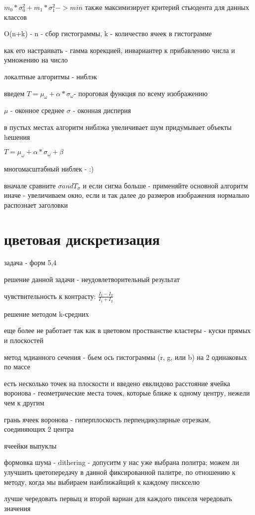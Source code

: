 \documentclass[]{report}
\begin{document}
$m_0*\sigma_0^2 + m_1*\sigma_1^2 -> min$
также максимизирует критерий стьюдента для данных классов

O(n+k) - n - сбор гистограммы, k - количество ячеек в гистограмме

как его настраивать - гамма корекцией, инвариантер к прибавлению числа и умножению на число

локалтные алгоритмы - ниблэк

введем $T=\mu_\omega+\alpha*\sigma_\omega$- пороговая функция по всему изображению

$\mu$ - оконное среднее
$\sigma$ - оконная дисперия

в пустых местах алгоритм ниблэка увеличивает шум
придумывает объекты
hешения

$T=\mu_\omega+\alpha*\sigma_\omega+\beta$

многомасштабный ниблек - :)

вначале сравните $\sigma and T_\sigma$
и если сигма больше - применяйте основной алгоритм
иначе - увеличиваем окно, если и так далее до размеров изображения
нормально распознает заголовки

\section{цветовая дискретизация}
задача - форм 5,4

решение данной задачи - неудовлетворительный результат

чувствительность к контрасту:
$\frac{I_1 - I_2}{I_1 + I_2}$

решение методом k-средних

еще более не работает
так как в цветовом простванстве кластеры - куски прямых и плоскостей

метод мдианного сечения - бьем ось гистограммы (r, g, или b) на 2 одинаковых по массе

есть несколько точек на плоскости и введено евклидово расстояние
ячейка воронова - геометрические места точек, которые ближе к одному центру, нежели чем к другим

грань ячеек воронова - гиперплоскость перпендикулярные отрезкам, соединяющих 2 центра

ячеейки выпуклы

формовка шума - dithering - допуситм у нас уже выбрана политра; можем ли улучшить цветопередачу в данной фиксированной палитре, по отношению к методу, когда мы выбираем наиближайщий к каждому пискселю

лучше чередовать первыц и второй вариан для каждого пикселя чередовать значения
\end{document}
